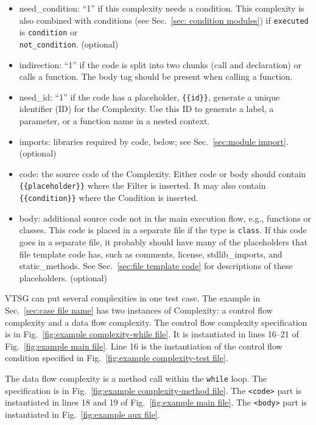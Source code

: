 \begin{itemize}
    \item need\_condition: ``1'' if this complexity needs a condition.
      This complexity is also combined with conditions (see
      Sec.~\ref{sec: condition modules}) if \verb|executed| is \verb|condition|
      or \\ \verb|not_condition|. (optional)

    \item indirection: ``1'' if the code is split into two chunks (call and
    declaration) or calls a function.  The body tag should be present when
    calling a function.

    \item need\_id: ``1'' if the code has a placeholder, \verb|{{id}}|,
    generate a unique identifier (ID) for the Complexity.  Use this ID to generate
    a label, a parameter, or a function name in a nested
    context.

    \item imports: libraries required by code, below; see Sec.~\ref{sec:module import}.
      (optional)

    \item code: the source code of the Complexity.  Either code or
    body should contain \\ \verb|{{placeholder}}|
    where the Filter is inserted.  It may also contain
    \verb|{{condition}}| where the Condition
    is inserted.

    \item body: additional source code not in the main execution flow,
    e.g., functions or classes.  This code is placed in a separate file
    if the type is \verb|class|.  If this code goes in a separate file, it probably
    should have many of the placeholders that file template code has, such as
    comments, license, stdlib\_imports, and static\_methods.
    See Sec.~\ref{sec:file template code} for descriptions of these placeholders.
    (optional)
\end{itemize}

VTSG can put several complexities in one test case.
The example in Sec.~\ref{sec:case file name} has two instances of
Complexity: a control flow complexity and a data flow complexity.
The control flow complexity specification is in
Fig.~\ref{fig:example complexity-while file}.  It is instantiated in
lines 16--21 of
Fig.~\ref{fig:example main file}.  Line 16 is the instantiation of
the control flow condition
specified in Fig.~\ref{fig:example complexity-test file}.

The data flow complexity is a method call within the \verb|while| loop.
The specification
is in Fig.~\ref{fig:example complexity-method file}.
The \verb|<code>|
part is instantiated in lines 18 and 19 of
Fig.~\ref{fig:example main file}.
The \verb|<body>| part is instantiated in
Fig.~\ref{fig:example aux file}.

